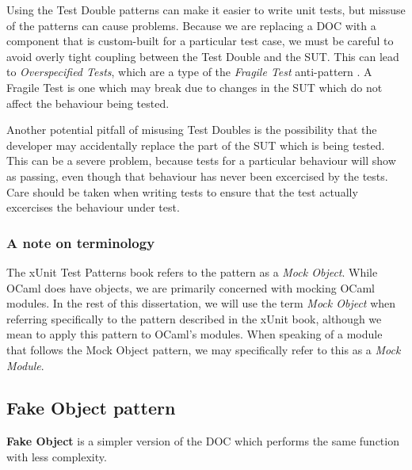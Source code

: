 Using the Test Double patterns can make it easier to write unit tests,
but missuse of the patterns can cause problems. Because we are
replacing a DOC with a component that is custom-built for a particular
test case, we must be careful to avoid overly tight coupling between
the Test Double and the SUT. This can lead to \textit{Overspecified
  Tests}, which are a type of the \textit{Fragile Test} anti-pattern
\cite{meszaros:xunit}. A Fragile Test is one which may break due to
changes in the SUT which do not affect the behaviour being tested.

Another potential pitfall of misusing Test Doubles is the possibility
that the developer may accidentally replace the part of the SUT which
is being tested. This can be a severe problem, because tests for a
particular behaviour will show as passing, even though that behaviour
has never been excercised by the tests. Care should be taken when
writing tests to ensure that the test actually excercises the
behaviour under test.

\subsubsection{A note on terminology}

The xUnit Test Patterns book refers to the pattern as a \textit{Mock
  Object}. While OCaml does have objects, we are primarily concerned
with mocking OCaml modules. In the rest of this dissertation, we will
use the term \textit{Mock Object} when referring specifically to the
pattern described in the xUnit book, although we mean to apply this
pattern to OCaml's modules. When speaking of a module that follows the
Mock Object pattern, we may specifically refer to this as a
\textit{Mock Module}.



\subsection{Fake Object pattern}
\label{testdoubles:fake}

\textbf{Fake Object} is a simpler version of the DOC which performs
the same function with less complexity.

